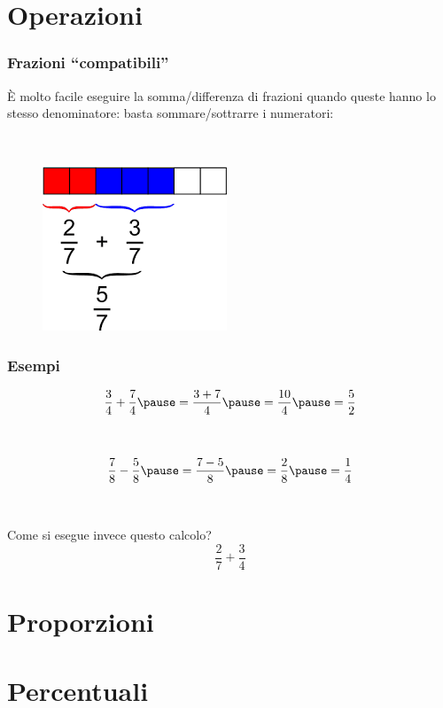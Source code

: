 \documentclass[]{beamer}
\theoremstyle{plain}
\begin{document}
\section{Operazioni}


\begin{frame}
\frametitle{Frazioni ``compatibili''}
È molto facile eseguire la somma/differenza di frazioni quando queste hanno \alert{lo stesso denominatore}: basta sommare/sottrarre i numeratori:

~

\begin{figure}
  \includegraphics[width=.4\columnwidth]{img/sommafraz.png}
\end{figure}
\end{frame}


\begin{frame}
\frametitle{Esempi}
\[ \frac{3}{4} + \frac{7}{4} \pause= \frac{3+7}{4}\pause = \frac{10}{4}\pause = \frac{5}{2}  \]\pause

~

\[ \frac{7}{8} - \frac{5}{8} \pause= \frac{7-5}{8}\pause = \frac{2}{8}\pause = \frac{1}{4}  \]\pause

~

Come si esegue invece questo calcolo?
\[ \frac{2}{7} + \frac{3}{4} \]
\end{frame}



\section{Proporzioni}



\section{Percentuali}
\end{document}
